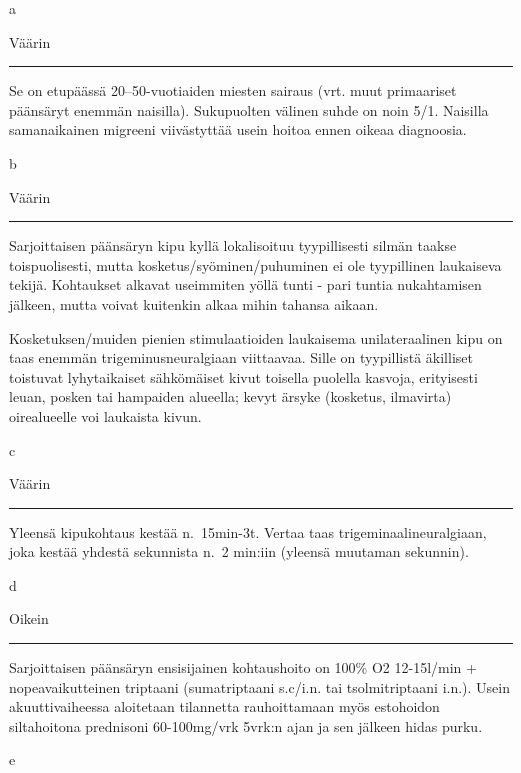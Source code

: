 \documentclass[
]{book}
\begin{document}
a

Väärin

\begin{center}\rule{0.5\linewidth}{0.5pt}\end{center}

Se on etupäässä 20--50-vuotiaiden miesten sairaus (vrt. muut primaariset päänsäryt enemmän naisilla). Sukupuolten välinen suhde on noin 5/1. Naisilla samanaikainen migreeni viivästyttää usein hoitoa ennen oikeaa diagnoosia.

b

Väärin

\begin{center}\rule{0.5\linewidth}{0.5pt}\end{center}

Sarjoittaisen päänsäryn kipu kyllä lokalisoituu tyypillisesti silmän taakse toispuolisesti, mutta kosketus/syöminen/puhuminen ei ole tyypillinen laukaiseva tekijä. Kohtaukset alkavat useimmiten yöllä tunti - pari tuntia nukahtamisen jälkeen, mutta voivat kuitenkin alkaa mihin tahansa aikaan.

Kosketuksen/muiden pienien stimulaatioiden laukaisema unilateraalinen kipu on taas enemmän trigeminusneuralgiaan viittaavaa. Sille on tyypillistä äkilliset toistuvat lyhytaikaiset sähkömäiset kivut toisella puolella kasvoja, erityisesti leuan, posken tai hampaiden alueella; kevyt ärsyke (kosketus, ilmavirta) oirealueelle voi laukaista kivun.

c

Väärin

\begin{center}\rule{0.5\linewidth}{0.5pt}\end{center}

Yleensä kipukohtaus kestää n.~15min-3t. Vertaa taas trigeminaalineuralgiaan, joka kestää yhdestä sekunnista n.~2 min:iin (yleensä muutaman sekunnin).

d

Oikein

\begin{center}\rule{0.5\linewidth}{0.5pt}\end{center}

Sarjoittaisen päänsäryn ensisijainen kohtaushoito on 100\% O2 12-15l/min + nopeavaikutteinen triptaani (sumatriptaani s.c/i.n. tai tsolmitriptaani i.n.). Usein akuuttivaiheessa aloitetaan tilannetta rauhoittamaan myös estohoidon siltahoitona prednisoni 60-100mg/vrk 5vrk:n ajan ja sen jälkeen hidas purku.

e
\end{document}
